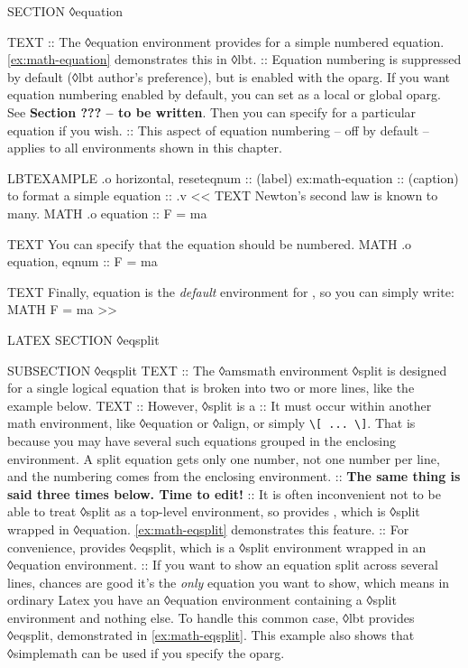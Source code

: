 \begin{lbt}
    SECTION ◊equation

    TEXT
    :: The ◊equation environment provides for a simple numbered equation. \cref{ex:math-equation} demonstrates this in ◊lbt.
    :: Equation numbering is suppressed by default (◊lbt author's preference), but is enabled with the  oparg. If you want equation numbering enabled by default, you can set  as a local or global oparg. See \textbf{Section ??? -- to be written}. Then you can specify  for a particular equation if you wish.
    :: This aspect of equation numbering -- off by default -- applies to all environments shown in this chapter.

    LBTEXAMPLE .o horizontal, reseteqnum
    :: (label) ex:math-equation
    :: (caption)  to format a simple equation
    :: .v <<
      TEXT Newton's second law is known to many.
      MATH .o equation :: F = ma

      TEXT You can specify that the equation should be numbered.
      MATH .o equation, eqnum :: F = ma

      TEXT Finally, equation is the \emph{default} environment for , so you can simply write:
      MATH F = ma
    >>

    LATEX \FloatBarrier
    SECTION ◊eqsplit

    SUBSECTION ◊eqsplit
    TEXT
    :: The ◊amsmath environment ◊split is designed for a single logical equation that is broken into two or more lines, like the example below.
    TEXT
    :: However, ◊split is a
    :: It must occur within another math environment, like ◊equation or ◊align, or simply \Verb|\[ ... \]|. That is because you may have several such equations grouped in the enclosing environment. A split equation gets only one number, not one number per line, and the numbering comes from the enclosing environment.
    :: \textbf{The same thing is said three times below. Time to edit!}
    :: It is often inconvenient not to be able to treat ◊split as a top-level environment, so  provides , which is ◊split wrapped in ◊equation. \cref{ex:math-eqsplit} demonstrates this feature.
    :: For convenience,  provides ◊eqsplit, which is a ◊split environment wrapped in an ◊equation environment.
    :: If you want to show an equation split across several lines, chances are good it's the \emph{only} equation you want to show, which means in ordinary Latex you have an ◊equation environment containing a ◊split environment and nothing else. To handle this common case, ◊lbt provides ◊eqsplit, demonstrated in \cref{ex:math-eqsplit}. This example also shows that ◊simplemath can be used if you specify the  oparg.


\end{lbt}
